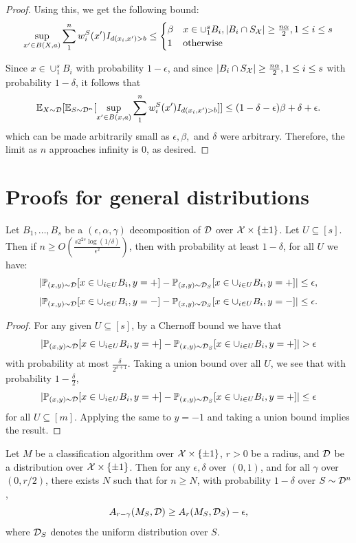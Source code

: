 \begin{proof}
Using this, we get the following bound: $$\sup_{x' \in B(X,a)} \sum_1^n w_i^S(x')I_{d(x_i, x') > b} \leq  \begin{cases} \beta & x \in \cup_1^s B_i, |B_i \cap S_\mathcal X| \geq \frac{n\alpha}{2}, 1 \leq i \leq s \\ 1 & \text{otherwise} \end{cases}$$ 

Since $x \in \cup_1^s B_i$ with probability $1-\epsilon$, and since $|B_i \cap S_\mathcal X| \geq \frac{n\alpha}{2}, 1 \leq i \leq s$ with probability $1-\delta$, it follows that $$\mathbb{E}_{X \sim {\mathcal D}}[\mathbb{E}_{S \sim {\mathcal D}^n} [\sup_{x' \in B(x,a)} \sum_1^n w_i^S(x')I_{d(x_i, x') > b}]] \leq (1- \delta - \epsilon)\beta + \delta + \epsilon.$$ which can be made arbitrarily small as $\epsilon, \beta,$ and $\delta$ were arbitrary. Therefore, the limit as $n$ approaches infinity is $0$, as desired. 
\end{proof}

\section{Proofs for general distributions}

\begin{lem}\label{chernoff_max_lem}
Let $B_1, \dots, B_s$ be a $(\epsilon, \alpha, \gamma)$ decomposition of ${\mathcal D}$ over $\mathcal X \times \{\pm 1\}$. Let $U \subseteq [s]$. Then if $n \geq O(\frac{s2^{2s}\log(1/\delta)}{\epsilon^2})$, then with probability at least $1-\delta$, for all $U$ we have: $$|\mathbb{P}_{(x,y) \sim {\mathcal D}}[x \in \cup_{i \in U} B_i, y = +] - \mathbb{P}_{(x,y) \sim {\mathcal D}_S}[x \in \cup_{i \in U} B_i, y = +]| \leq \epsilon,$$$$|\mathbb{P}_{(x,y) \sim {\mathcal D}}[x \in \cup_{i \in U} B_i, y = -] - \mathbb{P}_{(x,y) \sim {\mathcal D}_S}[x \in \cup_{i \in U} B_i, y = -]| \leq \epsilon.$$ 
\end{lem}
\begin{proof}
For any given $U \subseteq [s]$, by a Chernoff bound we have that $$|\mathbb{P}_{(x,y) \sim {\mathcal D}}[x \in \cup_{i \in U} B_i, y = +] - \mathbb{P}_{(x,y) \sim {\mathcal D}_S}[x \in \cup_{i \in U} B_i, y = +]| > \epsilon$$ with probability at most $\frac{\delta}{2^{s+1}}$. Taking a union bound over all $U$, we see that with probability $1-\frac{\delta}{2}$, $$|\mathbb{P}_{(x,y) \sim {\mathcal D}}[x \in \cup_{i \in U} B_i, y = +] - \mathbb{P}_{(x,y) \sim {\mathcal D}_S}[x \in \cup_{i \in U} B_i, y = +]| \leq \epsilon$$ for all $U \subseteq [m]$. Applying the same to $y = -1$ and taking a union bound implies the result.
\end{proof}

\begin{lem}\label{gen_thm}
Let $M$ be a classification algorithm over $\mathcal X \times \{\pm 1\}$, $r >0$ be a radius, and ${\mathcal D}$ be a distribution over $\mathcal X \times \{\pm 1\}$. Then for any $\epsilon, \delta$ over $(0,1)$, and for all $\gamma$ over $(0, r/2)$, there exists $N$ such that for $n \geq N$, with probability $1-\delta$ over $S \sim {\mathcal D}^n$, $$A_{r - \gamma}(M_S, {\mathcal D}) \geq A_r(M_S, {\mathcal D}_S) - \epsilon,$$ where ${\mathcal D}_S$ denotes the uniform distribution over $S$.  
\end{lem}

